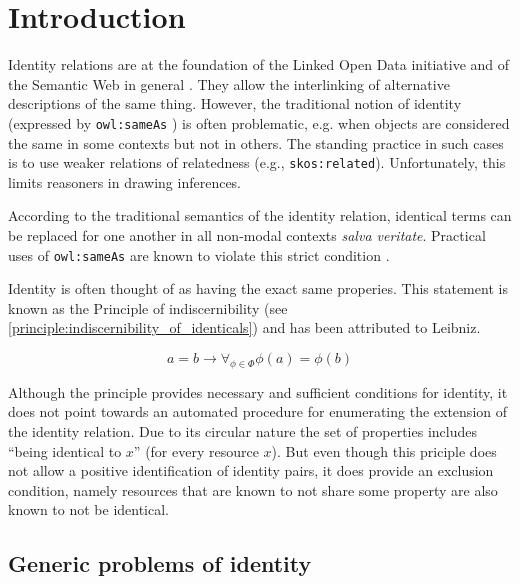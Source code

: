 \section{Introduction}
\label{sec:introduction}

Identity relations are at the foundation of the Linked Open Data initiative
  and of the Semantic Web in general \cite{bizer_cyganiak_heath_2007}.
They allow the interlinking of alternative descriptions of the same thing.
However, the traditional notion of identity
  (expressed by \verb|owl:sameAs| \cite{motic_paterschneider_grau_2012})
  is often problematic, e.g. when objects are considered the same in some
  contexts but not in others.
The standing practice in such cases is to use weaker relations of relatedness
  (e.g., \verb|skos:related|).
Unfortunately, this limits reasoners in drawing inferences.

According to the traditional semantics of the identity relation,
  identical terms can be replaced for one another in all non-modal contexts
  \emph{salva veritate}.
Practical uses of \verb|owl:sameAs| are known to violate this strict condition
  \cite{halpin_hayes_2010,halpin_hayes_mccusker_mcguinness_thompson_2010}.

Identity is often thought of as having the exact same properies.
This statement is known as the Principle of indiscernibility
(see \ref{principle:indiscernibility_of_identicals})
and has been attributed to Leibniz.\cite{TODO}

\small
\begin{principle}
\label{principle:indiscernibility_of_identicals}
\[
    a = b
  \rightarrow
    \forall_{\phi \in \Phi} \phi(a) = \phi(b)
\]
\end{principle}
\normalsize

Although the principle provides necessary and sufficient conditions
  for identity, it does not point towards an automated procedure
  for enumerating the extension of the identity relation.
Due to its circular nature the set of properties includes
  ``being identical to $x$'' (for every resource $x$).
But even though this priciple does not
  allow a positive identification of identity pairs,
  it does provide an exclusion condition,
  namely resources that are known to not share some property
  are also known to not be identical.

\subsection{Generic problems of identity}

